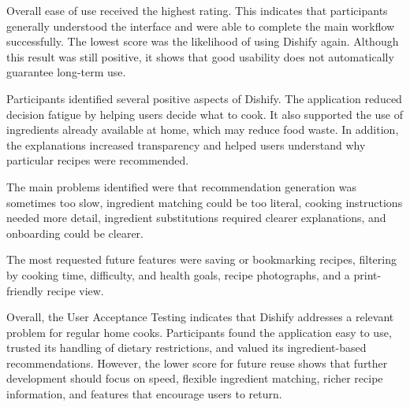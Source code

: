 Overall ease of use received the highest rating. This indicates that
participants generally understood the interface and were able to complete the
main workflow successfully. The lowest score was the likelihood of using
Dishify again. Although this result was still positive, it shows that good
usability does not automatically guarantee long-term use.

Participants identified several positive aspects of Dishify. The application
reduced decision fatigue by helping users decide what to cook. It also supported
the use of ingredients already available at home, which may reduce food waste.
In addition, the explanations increased transparency and helped users understand
why particular recipes were recommended.

The main problems identified were that recommendation generation was sometimes
too slow, ingredient matching could be too literal, cooking instructions needed
more detail, ingredient substitutions required clearer explanations, and
onboarding could be clearer.

The most requested future features were saving or bookmarking recipes, filtering
by cooking time, difficulty, and health goals, recipe photographs, and a
print-friendly recipe view.

Overall, the User Acceptance Testing indicates that Dishify addresses a relevant
problem for regular home cooks. Participants found the application easy to use,
trusted its handling of dietary restrictions, and valued its ingredient-based
recommendations. However, the lower score for future reuse shows that further
development should focus on speed, flexible ingredient matching, richer recipe
information, and features that encourage users to return.